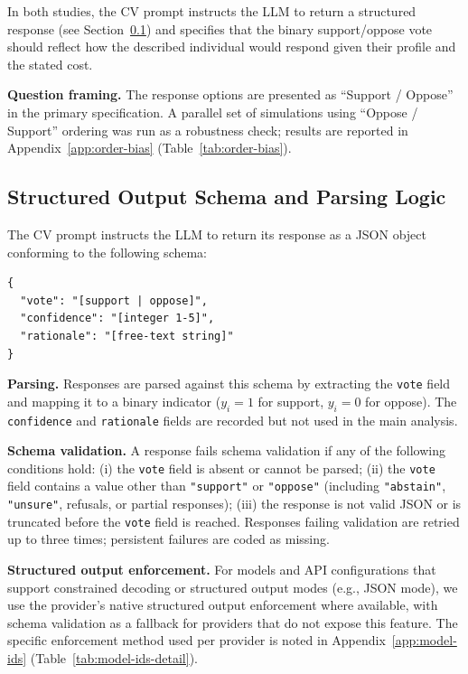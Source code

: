 \documentclass[12pt]{article}
\begin{document}
In both studies, the CV prompt instructs the LLM to return a structured response (see Section~\ref{app:platform-schema}) and specifies that the binary support/oppose vote should reflect how the described individual would respond given their profile and the stated cost.

\medskip\noindent\textbf{Question framing.} The response options are presented as ``Support / Oppose'' in the primary specification. A parallel set of simulations using ``Oppose / Support'' ordering was run as a robustness check; results are reported in Appendix~\ref{app:order-bias} (Table~\ref{tab:order-bias}).

\subsection{Structured Output Schema and Parsing Logic}\label{app:platform-schema}

The CV prompt instructs the LLM to return its response as a JSON object conforming to the following schema:
\begin{verbatim}
{
  "vote": "[support | oppose]",
  "confidence": "[integer 1-5]",
  "rationale": "[free-text string]"
}
\end{verbatim}

\medskip\noindent\textbf{Parsing.} Responses are parsed against this schema by extracting the \texttt{vote} field and mapping it to a binary indicator ($y_i = 1$ for support, $y_i = 0$ for oppose). The \texttt{confidence} and \texttt{rationale} fields are recorded but not used in the main analysis.

\medskip\noindent\textbf{Schema validation.} A response fails schema validation if any of the following conditions hold: (i) the \texttt{vote} field is absent or cannot be parsed; (ii) the \texttt{vote} field contains a value other than \texttt{"support"} or \texttt{"oppose"} (including \texttt{"abstain"}, \texttt{"unsure"}, refusals, or partial responses); (iii) the response is not valid JSON or is truncated before the \texttt{vote} field is reached. Responses failing validation are retried up to three times; persistent failures are coded as missing.

\medskip\noindent\textbf{Structured output enforcement.} For models and API configurations that support constrained decoding or structured output modes (e.g., JSON mode), we use the provider's native structured output enforcement where available, with schema validation as a fallback for providers that do not expose this feature. The specific enforcement method used per provider is noted in Appendix~\ref{app:model-ids} (Table~\ref{tab:model-ids-detail}).
\end{document}
